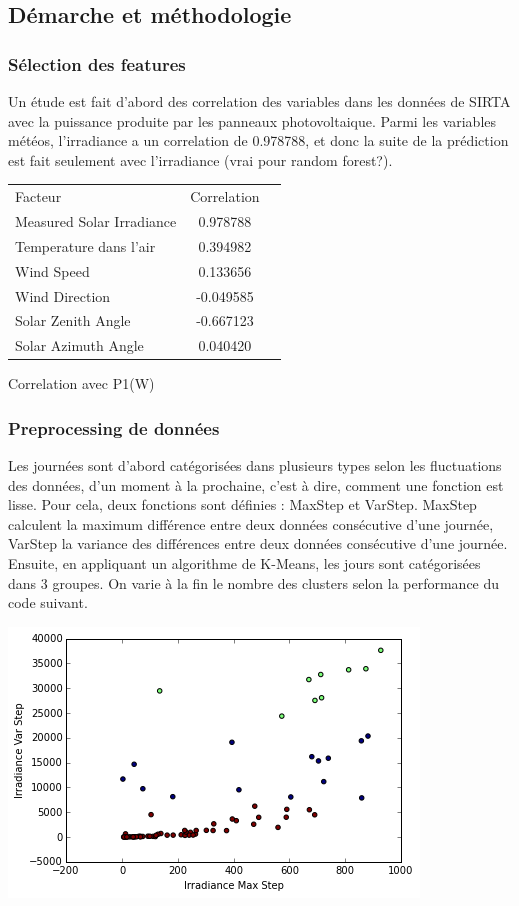 \documentclass[a4paper]{article}
\begin{document}
\begin{multicols}{2}

\subsection{Démarche et méthodologie}
\subsubsection{Sélection des features}
Un étude est fait d’abord des correlation des variables dans les données de SIRTA avec la puissance produite par les panneaux photovoltaique. Parmi les variables météos, l’irradiance a un correlation de 0.978788, et donc la suite de la prédiction est fait seulement avec l’irradiance (vrai pour random forest?).

\begin{tabular}{l c r}
  Facteur & Correlation \\
  Measured Solar Irradiance & 0.978788 \\
  Temperature dans l’air & 0.394982 \\
  Wind Speed & 0.133656 \\
  Wind Direction & -0.049585 \\
  Solar Zenith Angle & -0.667123 \\
  Solar Azimuth Angle & 0.040420 \\
\end{tabular}
\tablename{ Correlation avec P1(W)}

\subsubsection{Preprocessing de données}

Les journées sont d’abord catégorisées dans plusieurs types selon les fluctuations des données, d’un moment à la prochaine, c’est à dire, comment une fonction est lisse. Pour cela, deux fonctions sont définies : MaxStep et VarStep. MaxStep calculent la maximum différence entre deux données consécutive d’une journée, VarStep la variance des différences entre deux données consécutive d’une journée. Ensuite, en appliquant un algorithme de K-Means, les jours sont catégorisées dans 3 groupes. On varie à la fin le nombre des clusters selon la performance du code suivant.


\includegraphics[width=\textwidth/2]{./images/categoriesgraph.png}



\end{multicols}
\end{document}

